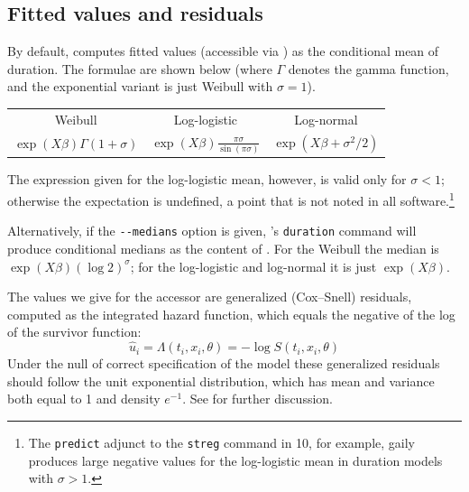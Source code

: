 \subsection{Fitted values and residuals}

By default,  computes fitted values (accessible via
) as the conditional mean of duration.  The formulae
are shown below (where $\Gamma$ denotes the gamma function, and the
exponential variant is just Weibull with $\sigma = 1$).

\begin{center}
\setlength\tabcolsep{1em}
\begin{tabular}{ccc}
Weibull & Log-logistic & Log-normal \\ [4pt]
$\exp(X\beta)\Gamma(1 + \sigma)$ &
$\displaystyle \exp(X\beta)\frac{\pi \sigma}{\sin(\pi \sigma)}$ &
$\exp(X\beta + \sigma^2/2)$
\end{tabular}
\end{center}

The expression given for the log-logistic mean, however, is valid only
for $\sigma < 1$; otherwise the expectation is undefined, a point that
is not noted in all software.\footnote{The \texttt{predict} adjunct to
  the \texttt{streg} command in  10, for example, gaily
  produces large negative values for the log-logistic mean in duration
  models with $\sigma > 1$.}

Alternatively, if the \verb|--medians| option is given, 's
\texttt{duration} command will produce conditional medians as the
content of .  For the Weibull the median is
$\exp(X\beta)(\log 2)^\sigma$; for the log-logistic and log-normal it
is just $\exp(X\beta)$.

The values we give for the accessor  are generalized
(Cox--Snell) residuals, computed as the integrated hazard function,
which equals the negative of the log of the survivor function:
\[
\hat{u}_i = \Lambda(t_i, x_i, \theta) = -\log S(t_i, x_i, \theta)
\]
Under the null of correct specification of the model these generalized
residuals should follow the unit exponential distribution, which has
mean and variance both equal to 1 and density $e^{-1}$. See
\cite{cameron-trivedi05} for further discussion.

